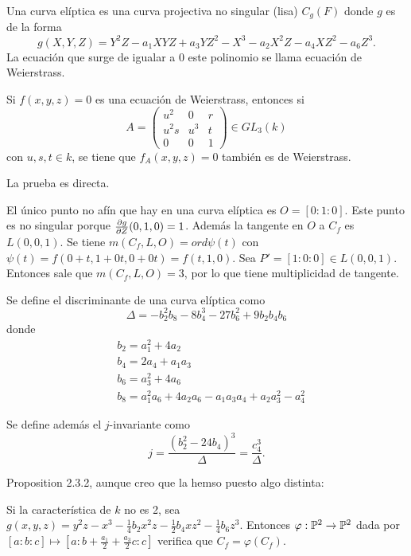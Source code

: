 \documentclass[CR.tex]{subfiles}
\begin{document}
\begin{defi}
Una curva elíptica es una curva projectiva no singular (lisa) $C_g(F)$ donde $g$ es de la forma
\[
g(X,Y,Z)=Y^2Z-a_1XYZ+a_3YZ^2-X^3-a_2X^2Z-a_4XZ^2-a_6Z^3.
\]
La ecuación que surge de igualar a 0 este polinomio se llama ecuación de Weierstrass. 
\end{defi}


\begin{lemma}
Si $f(x,y,z)=0$ es una ecuación de Weierstrass, entonces si
\[
A=\begin{pmatrix}
u^2 & 0 & r\\
u^2s & u^3 & t\\
0 & 0 & 1
\end{pmatrix}\in GL_3(k)
\]
con $u,s,t\in k$, se tiene que $f_A(x,y,z)=0$ también es de Weierstrass.
\end{lemma}
La prueba es directa. 

El único punto no afín que hay en una curva elíptica es $O=[0:1:0]$. Este punto es no singular porque $\frac{\partial g}{\partial Z}(0,1,0)=1$. Además la tangente en $O$ a $C_f$ es $L(0,0,1)$. Se tiene $m(C_f,L,O)=ord\psi(t)$ con $\psi(t)=f(0+t,1+0t,0+0t)=f(t,1,0)$. Sea $P'=[1:0:0]\in L(0,0,1)$. Entonces sale que $m(C_f,L,O)=3$, por lo que tiene multiplicidad de tangente. 

\begin{defi}
Se define el discriminante de una curva elíptica como 
\[
\Delta=-b_2^2b_8-8b_4^3-27b_6^2+9b_2b_4b_6
\]
donde
\begin{align*}
&b_2=a_1^2+4a_2\\
&b_4=2a_4+a_1a_3\\
&b_6=a_3^2+4a_6\\
&b_8=a_1^2a_6+4a_2a_6-a_1a_3a_4+a_2a_3^2-a_4^2
\end{align*}

Se define además el $j$-invariante como 
\[
j=\frac{(b_2^2-24b_4)^3}{\Delta}=\frac{c_4^3}{\Delta}.
\]
\end{defi}



Proposition 2.3.2, aunque creo que la hemso puesto algo distinta:

\begin{lemma}
Si la característica de $k$ no es 2, sea $g(x,y,z)=y^2z-x^3-\frac{1}{4}b_2x^2z-\frac{1}{2}b_4xz^2-\frac{1}{4}b_6z^3$. Entonces $\varphi:\mathbb{P}^2\to \mathbb{P}^2$ dada por $[a:b:c]\mapsto [a:b+\frac{a_1}{2}+\frac{a_3}{2}c:c]$ verifica que $C_f=\varphi(C_f)$.
\end{lemma}
\end{document}
